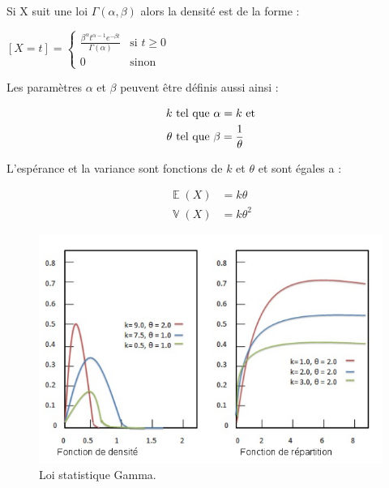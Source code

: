 \documentclass[a4paper,12pt]{report}
\DeclareMathOperator{\E}{\mathbb{E}} %
\DeclareMathOperator{\V}{\mathbb{V}} %
\theoremstyle{plain}				%
\theoremstyle{definition}				%
\begin{document}
Si X suit une loi $\Gamma(\alpha, \beta)$ alors la densité est de la forme :

  \begin{center}
  $[X=t] = \left\{
    \begin{array}{ll}
    	\frac{\beta^{\alpha} t^{\alpha-1} e^{-\beta t}}{\Gamma(\alpha)}  & 
    	\mbox{si } t \geq 0  \\
        0 & 
        \mbox{sinon}
    \end{array}
	\right.$
  \label{definitionLoiGammaDensite}
  \end{center}
   
Les paramètres $\alpha$ et $\beta$ peuvent être définis aussi ainsi :

   
\begin{align*}
   k 		& \textnormal{ tel que } \alpha = k  \textnormal{ et} \\
   \theta 	& \textnormal{ tel que } \beta  = \frac{1}{\theta}
\end{align*}

L’espérance et la variance sont fonctions de $k$ et $\theta$ et sont égales a :

\begin{align*}
	\E(X) &= k \theta \\
	\V(X) &= k \theta ^2
\end{align*}

\begin{figure}
{\centering
\includegraphics[width=\columnwidth]{loiStatGamma.png}
\caption{Loi statistique Gamma.}
\label{fig:LoiStatistiquesGamma}
\par}
\end{figure}
\end{document}
